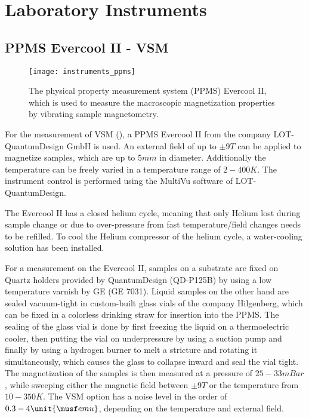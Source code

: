 \documentclass[\main/dresen_thesis.tex]{subfiles}
\begin{document}
\section{Laboratory Instruments}
  \subsection{PPMS Evercool II - VSM}
    \label{ch:instruments:laboratoryInstruments:vsm}
    \begin{figure}[ht]
      \centering
      \texttt{[image: instruments\_ppms]}
      \caption{\label{fig:appendix:instruments:ppms}The physical property measurement system (PPMS) Evercool II, which is used to measure the macroscopic magnetization properties by vibrating sample magnetometry.}
    \end{figure}
    For the measurement of VSM (), a PPMS Evercool II from the company LOT-QuantumDesign GmbH is used.
    An external field of up to $\pm 9 \unit{T}$ can be applied to magnetize samples, which are up to $5 \unit{mm}$ in diameter.
    Additionally the temperature can be freely varied in a temperature range of $2 - 400 \unit{K}$.
    The instrument control is performed using the MultiVu software of LOT-QuantumDesign.

    The Evercool II has a closed helium cycle, meaning that only Helium lost during sample change or due to over-pressure from fast temperature/field changes needs to be refilled.
    To cool the Helium compressor of the helium cycle, a water-cooling solution has been installed.

    For a measurement on the Evercool II, samples on a substrate are fixed on Quartz holders provided by QuantumDesign (QD-P125B) by using a low temperature varnish by GE (GE 7031).
    Liquid samples on the other hand are sealed vacuum-tight in custom-built glass vials of the company Hilgenberg, which can be fixed in a colorless drinking straw for insertion into the PPMS.
    The sealing of the glass vial is done by first freezing the liquid on a thermoelectric cooler, then putting the vial on underpressure by using a suction pump and finally by using a hydrogen burner to melt a stricture and rotating it simultaneously, which causes the glass to collapse inward and seal the vial tight.
    The magnetization of the samples is then measured at a pressure of $25 - 33 \unit{mBar}$, while sweeping either the magnetic field between $\pm 9 \unit{T}$ or the temperature from $10 - 350 \unit{K}$.
    The VSM option has a noise level in the order of $0.3 - 4 \unit{\musf emu}$, depending on the temperature and external field.
\end{document}
